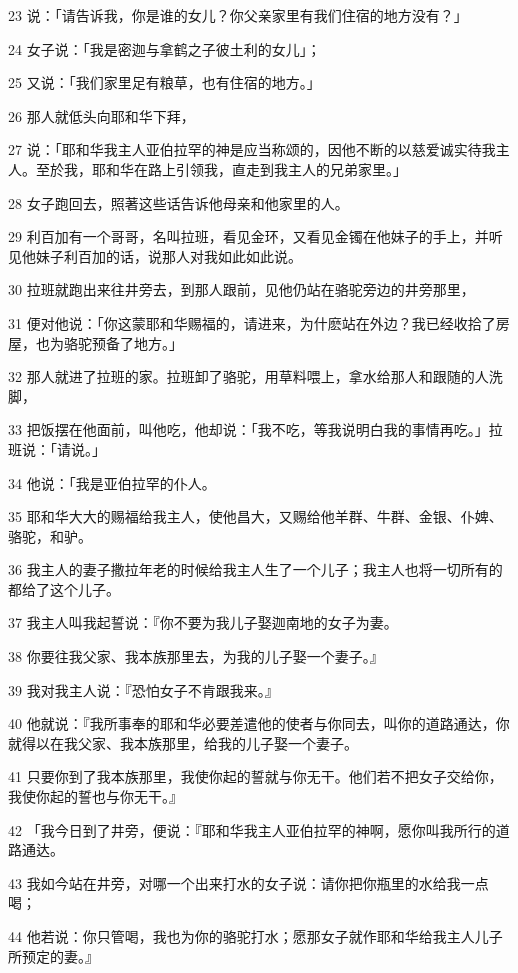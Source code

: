 \par 23 说：「请告诉我，你是谁的女儿？你父亲家里有我们住宿的地方没有？」
\par 24 女子说：「我是密迦与拿鹤之子彼土利的女儿」；
\par 25 又说：「我们家里足有粮草，也有住宿的地方。」
\par 26 那人就低头向耶和华下拜，
\par 27 说：「耶和华我主人亚伯拉罕的神是应当称颂的，因他不断的以慈爱诚实待我主人。至於我，耶和华在路上引领我，直走到我主人的兄弟家里。」
\par 28 女子跑回去，照著这些话告诉他母亲和他家里的人。
\par 29 利百加有一个哥哥，名叫拉班，看见金环，又看见金镯在他妹子的手上，并听见他妹子利百加的话，说那人对我如此如此说。
\par 30 拉班就跑出来往井旁去，到那人跟前，见他仍站在骆驼旁边的井旁那里，
\par 31 便对他说：「你这蒙耶和华赐福的，请进来，为什麽站在外边？我已经收拾了房屋，也为骆驼预备了地方。」
\par 32 那人就进了拉班的家。拉班卸了骆驼，用草料喂上，拿水给那人和跟随的人洗脚，
\par 33 把饭摆在他面前，叫他吃，他却说：「我不吃，等我说明白我的事情再吃。」拉班说：「请说。」
\par 34 他说：「我是亚伯拉罕的仆人。
\par 35 耶和华大大的赐福给我主人，使他昌大，又赐给他羊群、牛群、金银、仆婢、骆驼，和驴。
\par 36 我主人的妻子撒拉年老的时候给我主人生了一个儿子；我主人也将一切所有的都给了这个儿子。
\par 37 我主人叫我起誓说：『你不要为我儿子娶迦南地的女子为妻。
\par 38 你要往我父家、我本族那里去，为我的儿子娶一个妻子。』
\par 39 我对我主人说：『恐怕女子不肯跟我来。』
\par 40 他就说：『我所事奉的耶和华必要差遣他的使者与你同去，叫你的道路通达，你就得以在我父家、我本族那里，给我的儿子娶一个妻子。
\par 41 只要你到了我本族那里，我使你起的誓就与你无干。他们若不把女子交给你，我使你起的誓也与你无干。』
\par 42 「我今日到了井旁，便说：『耶和华我主人亚伯拉罕的神啊，愿你叫我所行的道路通达。
\par 43 我如今站在井旁，对哪一个出来打水的女子说：请你把你瓶里的水给我一点喝；
\par 44 他若说：你只管喝，我也为你的骆驼打水；愿那女子就作耶和华给我主人儿子所预定的妻。』
